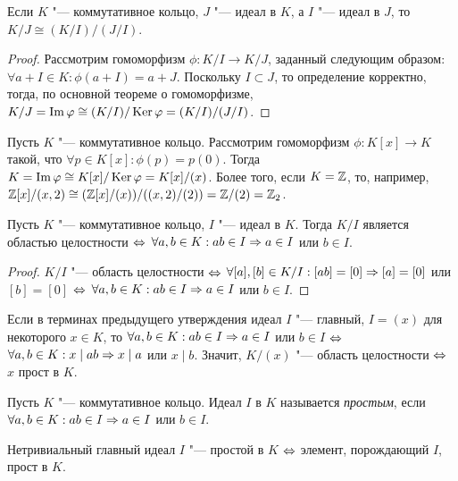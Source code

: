 \begin{proposition}
	Если $K$ "--- коммутативное кольцо, $J$ "--- идеал в $K$, а $I$ "--- идеал в $J$, то $K / J \cong (K / I) / (J / I)$.
\end{proposition}

\begin{proof}
	Рассмотрим гомоморфизм $\phi: K / I \to K / J$, заданный следующим образом: $\forall a + I \in K: \phi(a + I) = a + J$. Поскольку $I \subset J$, то определение корректно, тогда, по основной теореме о гомоморфизме, $K / J = \operatorname{Im}\varphi \cong (K / I) / \operatorname{Ker}\varphi = (K / I) / (J / I)$.
\end{proof}

\begin{example}
	Пусть $K$ "--- коммутативное кольцо. Рассмотрим гомоморфизм $\phi: K[x] \to K$ такой, что $\forall p \in K[x]: \phi(p) = p(0)$. Тогда $K = \operatorname{Im}\varphi \cong K[x] / \operatorname{Ker}\varphi = K[x] / (x)$. Более того, если $K = \mathbb{Z}$, то, например, $\mathbb{Z}[x] / (x, 2) \cong (\mathbb{Z}[x] / (x)) / ((x, 2) / (2)) = \mathbb{Z} / (2) = \mathbb{Z}_2$.
\end{example}

\begin{proposition}
	Пусть $K$ "--- коммутативное кольцо, $I$ "--- идеал в $K$. Тогда $K / I$ является областью целостности $\Leftrightarrow$ $\forall a, b \in K: ab \in I \Rightarrow a \in I$ или $b \in I$.
\end{proposition}

\begin{proof}
	$K / I$ "--- область целостности $\Leftrightarrow$ $\forall [a], [b] \in K / I: [ab] = [0] \Rightarrow [a] = [0]$ или $[b] = [0]$ $\Leftrightarrow$ $\forall a, b \in K: ab \in I \Rightarrow a \in I$ или $b \in I$.
\end{proof}

\begin{note}
	Если в терминах предыдущего утверждения идеал $I$ "--- главный, $I = (x)$ для некоторого $x \in K$, то $\forall a, b \in K: ab \in I \Rightarrow a \in I$ или $b \in I$ $\Leftrightarrow$ $\forall a, b \in K: x \mid ab \Rightarrow x \mid a$ или $x \mid b$. Значит, $K / (x)$ "--- область целостности $\Leftrightarrow$ $x$ прост в $K$.
\end{note}

\begin{definition}
	Пусть $K$ "--- коммутативное кольцо. Идеал $I$ в $K$ называется \textit{простым}, если $\forall a, b \in K: ab \in I \Rightarrow a \in I$ или $b \in I$.
\end{definition}

\begin{note}
	Нетривиальный главный идеал $I$ "--- простой в $K$ $\Leftrightarrow$ элемент, порождающий $I$, прост в $K$.
\end{note}

